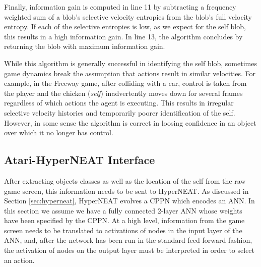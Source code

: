 \documentclass{acm_proc_article-sp}
\begin{document}
Finally, information gain is computed in line 11 by subtracting a frequency weighted sum of a blob's selective velocity entropies from the blob's full velocity entropy. If each of the selective entropies is low, as we expect for the self blob, this results in a high information gain. In line 13, the algorithm concludes by returning the blob with maximum information gain.

While this algorithm is generally successful in identifying the self blob, sometimes game dynamics break the assumption that actions result in similar velocities. For example, in the Freeway game, after colliding with a car, control is taken from the player and the chicken (\textit{self}) inadvertently moves down for several frames regardless of which actions the agent is executing. This results in irregular selective velocity histories and temporarily poorer identification of the self. However, in some sense the algorithm is correct in loosing confidence in an object over which it no longer has control.

\subsection{Atari-HyperNEAT Interface}

After extracting objects classes as well as the location of the self from the raw game screen, this information needs to be sent to HyperNEAT. As discussed in Section \ref{sec:hyperneat}, HyperNEAT evolves a CPPN which encodes an ANN. In this section we assume we have a fully connected 2-layer ANN whose weights have been specified by the CPPN. At a high level, information from the game screen needs to be translated to activations of nodes in the input layer of the ANN, and, after the network has been run in the standard feed-forward fashion, the activation of nodes on the output layer must be interpreted in order to select an action.
\end{document}
